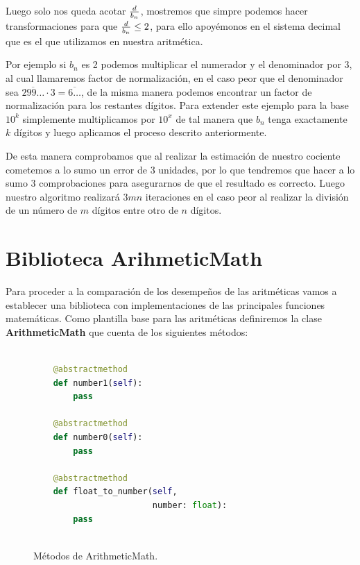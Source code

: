 \documentclass[a4paper,10pt,twocolumn]{article}
\begin{document}
	Luego solo nos queda acotar ${d\over b_n}$, mostremos que simpre podemos hacer transformaciones para que ${d\over b_n}\leq 2$, para ello apoyémonos en el sistema decimal que es el que utilizamos en nuestra aritmética. 
	
	Por ejemplo si $b_n$ es 2 podemos multiplicar el numerador y el denominador por 3, al cual llamaremos factor de normalización, en el caso peor que el denominador sea $\overline{299\ldots} \cdot 3= \overline{6\ldots }$, de la misma manera podemos encontrar un factor de normalización para los restantes dígitos. Para extender este ejemplo para la base $10^k$ simplemente multiplicamos por $10^x$ de tal manera que $b_n$ tenga exactamente $k$ dígitos y luego aplicamos el proceso descrito anteriormente.
	
	De esta manera comprobamos que al realizar la estimación de nuestro cociente cometemos a lo sumo un error de 3 unidades, por lo que tendremos que hacer a lo sumo 3 comprobaciones para asegurarnos de que el resultado es correcto. Luego nuestro algoritmo realizará $3mn$ iteraciones en el caso peor al realizar la división de un número de $m$ dígitos entre otro de $n$ dígitos. 
	
\section{Biblioteca ArihmeticMath}\label{suc:arithmetic_math}
	Para proceder a la comparación de los desempeños de las aritméticas vamos a establecer una biblioteca con implementaciones de las principales funciones matemáticas. Como plantilla base para las aritméticas definiremos la clase \textbf{ArithmeticMath} que cuenta de los siguientes métodos:
	

		\begin{figure}[htb]%
			\begin{lstlisting}[language=python]%

    @abstractmethod
    def number1(self):
        pass

    @abstractmethod
    def number0(self):
        pass
        
    @abstractmethod
    def float_to_number(self, 
                        number: float):
        pass
		
		\end{lstlisting}
		\caption{Métodos de ArithmeticMath.\label{fig:code}}
		\end{figure}
	
\end{document}
